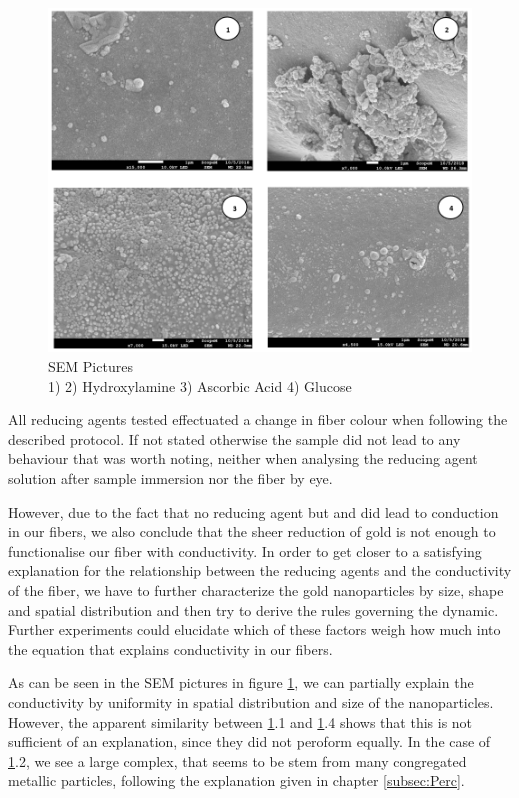  \begin{figure}[H]
 	\centerline{\includegraphics[width=\textwidth]{./pic/SEM/Combination.png}}
 	\caption{SEM Pictures\\
 	1)  2) Hydroxylamine 3) Ascorbic Acid 4) Glucose}
 	\label{fig:SEMPicCombo}
 \end{figure}
 


All reducing agents tested effectuated a change in fiber colour when following the described protocol. If not stated otherwise the sample did not lead to any behaviour that was worth noting, neither when analysing the reducing agent solution after sample immersion nor the fiber by eye.

However, due to the fact that no reducing agent but  and  did lead to conduction in our fibers, we also conclude that the sheer reduction of gold is not enough to functionalise our fiber with conductivity. In order to get closer to a satisfying explanation for the relationship between the reducing agents and the conductivity of the fiber, we have to further characterize the gold nanoparticles by size, shape and spatial distribution and then try to derive the rules governing the dynamic. Further experiments could elucidate which of these factors weigh how much into the equation that explains conductivity in our fibers. 

As can be seen in the SEM pictures in figure \ref{fig:SEMPicCombo}, we can partially explain the conductivity by uniformity in spatial distribution and size of the nanoparticles. However, the apparent similarity between \ref{fig:SEMPicCombo}.1 and \ref{fig:SEMPicCombo}.4 shows that this is not sufficient of an explanation, since they did not peroform equally. In the case of \ref{fig:SEMPicCombo}.2, we see a large complex, that seems to be stem from many congregated metallic particles, following the explanation given in chapter \ref{subsec:Perc}. 

